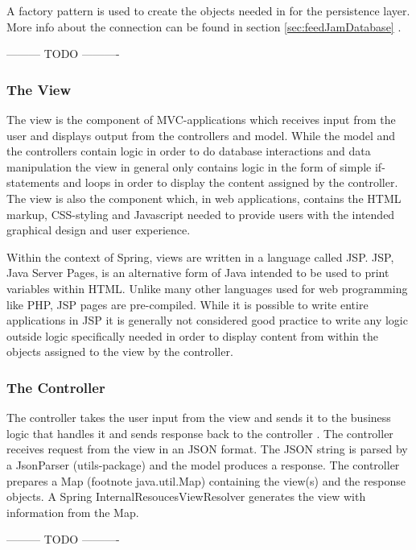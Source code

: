 A factory pattern is used to create the objects needed in for the persistence layer. 
More info about the connection can be found in section \ref{sec:feedJamDatabase} .


--------- TODO ---------- 

\subsubsection{The View}
The view is the component of MVC-applications which receives input from the user and displays output from the controllers and model. While the model and the controllers contain logic in order to do database interactions and data manipulation the view in general only contains logic in the form of simple if-statements and loops in order to display the content assigned by the controller. The view is also the component which, in web applications, contains the HTML markup, CSS-styling and Javascript needed to provide users with the intended graphical design and user experience.

Within the context of Spring, views are written in a language called JSP. JSP, Java Server Pages, is an alternative form of Java intended to be used to print variables within HTML. Unlike many other languages used for web programming like PHP, JSP pages are pre-compiled. While it is possible to write entire applications in JSP it is generally not considered good practice to write any logic outside logic specifically needed in order to display content from within the objects assigned to the view by the controller.

\subsubsection{The Controller}
The controller takes the user input from the view and sends it to the business logic that handles it and sends response back to the controller \cite{}. The controller receives request from the view in an JSON format. The JSON string is parsed by a JsonParser (utils-package) and the model produces a response. The controller prepares a Map (footnote java.util.Map) containing the view(s) and the response objects. A Spring InternalResoucesViewResolver generates the view with information  from the Map.

--------- TODO ---------- 

